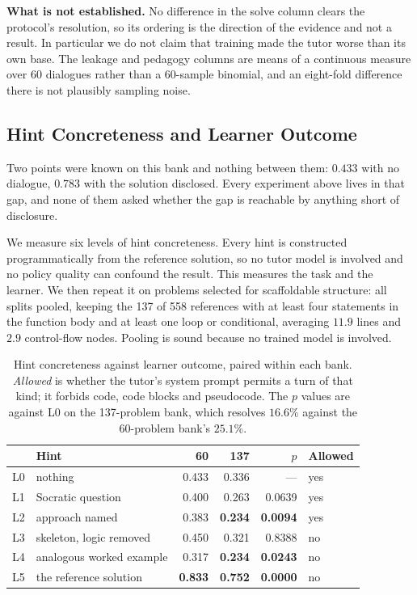 \documentclass[conference]{IEEEtran}
\begin{document}
\textbf{What is not established.} No difference in the solve column clears the
protocol's resolution, so its ordering is the direction of the evidence and not
a result. In particular we do not claim that training made the tutor worse than
its own base. The leakage and pedagogy columns are means of a continuous
measure over 60 dialogues rather than a 60-sample binomial, and an eight-fold
difference there is not plausibly sampling noise.

\subsection{Hint Concreteness and Learner Outcome}
\label{sec:ladder}

Two points were known on this bank and nothing between them: $0.433$ with no
dialogue, $0.783$ with the solution disclosed. Every experiment above lives in
that gap, and none of them asked whether the gap is reachable by anything short
of disclosure.

We measure six levels of hint concreteness. Every hint is constructed
programmatically from the reference solution, so no tutor model is involved and
no policy quality can confound the result. This measures the task and the
learner. We then repeat it on problems selected for scaffoldable structure: all
splits pooled, keeping the 137 of 558 references with at least four statements
in the function body and at least one loop or conditional, averaging $11.9$
lines and $2.9$ control-flow nodes. Pooling is sound because no trained model
is involved.

\begin{table}[t]
\caption{Hint concreteness against learner outcome, paired within each bank.
\emph{Allowed} is whether the tutor's system prompt permits a turn of that
kind; it forbids code, code blocks and pseudocode. The $p$ values are against
L0 on the 137-problem bank, which resolves $16.6\%$ against the 60-problem
bank's $25.1\%$.}
\label{tab:ladder}
\centering
\small
\begin{tabular}{llrrrl}
\toprule
 & \textbf{Hint} & \textbf{60} & \textbf{137} & \textbf{$p$} & \textbf{Allowed} \\
\midrule
L0 & nothing                   & 0.433 & 0.336 & ---    & yes \\
L1 & Socratic question         & 0.400 & 0.263 & 0.0639 & yes \\
L2 & approach named            & 0.383 & \textbf{0.234} & \textbf{0.0094} & yes \\
L3 & skeleton, logic removed   & 0.450 & 0.321 & 0.8388 & no \\
L4 & analogous worked example  & 0.317 & \textbf{0.234} & \textbf{0.0243} & no \\
L5 & the reference solution    & \textbf{0.833} & \textbf{0.752} & \textbf{0.0000} & no \\
\bottomrule
\end{tabular}
\end{table}
\end{document}

